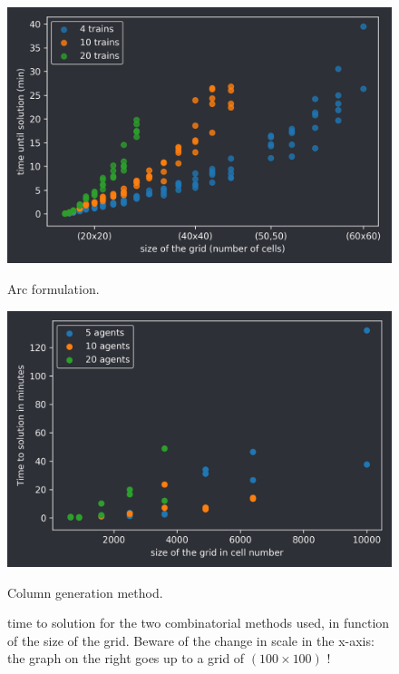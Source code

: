 \documentclass[14pt,a4paper]{article}
\theoremstyle{definition}
\numberwithin{equation}{subsection}
\begin{document}
\begin{figure}[h]
	\begin{minipage}{0.5\linewidth}
		
		
		
		\includegraphics[width=\linewidth]{img/time1.png}
		\caption*{Arc formulation.}

	\end{minipage}
	\begin{minipage}{0.5\linewidth}
		\includegraphics[width=\linewidth]{img/time2.png}
		\caption*{Column generation method.}
	\end{minipage}
	\caption{time to solution for the two combinatorial methods used, in function of the size of the grid. Beware of the change in scale in the x-axis: the graph on the right goes up to a grid of $(100\times100)$ ! }

\end{figure}



\newpage
{}
 \nocite{*} 




\end{document}
